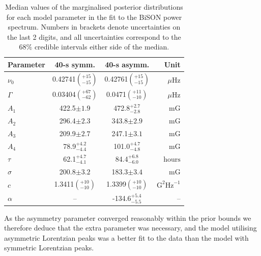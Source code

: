 \begin{table}[ht!]
	\begin{center}
		\caption{Median values of the marginalised posterior distributions for each model parameter in the fit to the BiSON power spectrum. Numbers in brackets denote uncertainties on the last 2 digits, and all uncertainties correspond to the $68 \%$ credible intervals either side of the median.}
		\label{tab:PSD_fit_params}
		\begin{tabular}{l c c r}
			\hline
			{Parameter} & {40-s symm.} & {40-s asymm.} & {Unit} \\
			\hline
			
			{$\nu_0$} & {0.42741$\left(_{-15}^{+15}\right)$} & {0.42761$\left(_{-15}^{+15}\right)$} & {$\mu\mathrm{Hz} $}\\
			
			{$\Gamma$} & {0.03404$\left(_{-62}^{+67}\right)$} & {0.0471$\left(_{-10}^{+11}\right)$} & {$\mu\mathrm{Hz} $} \\
			
			{$A_1$} & {422.5$\pm 1.9$} & {472.8$_{-2.8}^{+2.7}$} & {$\mathrm{mG}$} \\
			
			{$A_2$} & {296.4$\pm 2.3$} & {343.8$\pm 2.9$} & {$\mathrm{mG}$} \\
			
			{$A_3$} & {209.9$\pm 2.7$} & {247.1$\pm 3.1$} & {$\mathrm{mG}$} \\
			
			{$A_4$} & {78.9$_{-4.4}^{+4.2}$} & {101.0$_{-4.8}^{+4.7}$} &  {$\mathrm{mG}$} \\	
			
			{$\tau$} & {62.1$_{-4.1}^{+4.7}$} & {84.4$_{-6.0}^{+6.8}$} & {$\mathrm{hours}$} \\	
			
			{$\sigma$} & {200.8$\pm 3.2$} & {183.3$\pm 3.4$} &  {$\mathrm{mG}$} \\	
			
			{$c$} & {1.3411$\left(_{-10}^{+10}\right)$} & {1.3399$\left(_{-10}^{+10}\right)$}  & {$\mathrm{G}^2\mathrm{Hz}^{-1}$} \\	
			
			{$\alpha$} & {--} & {-134.6$_{-5.5}^{+5.4}$} & {--} \\	
			\hline
		\end{tabular}
	\end{center}
\end{table}

As the asymmetry parameter converged reasonably within the prior bounds we therefore deduce that the extra parameter was necessary, and the model utilising asymmetric Lorentzian peaks was a better fit to the data than the model with symmetric Lorentzian peaks.

